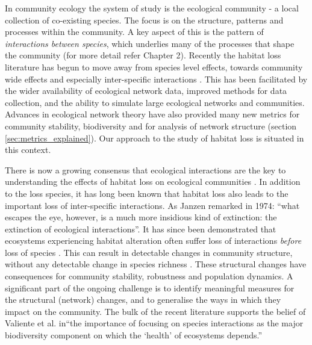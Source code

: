 
In community ecology the system of study is the ecological community - a local collection of co-existing species. The focus is on the structure, patterns and processes within the community. A key aspect of this is the pattern of \emph{interactions between species}, which underlies many of the processes that shape the community (for more detail refer Chapter 2). Recently the habitat loss literature has begun to move away from species level effects, towards community wide effects and especially inter-specific interactions \cite{valiente2015beyond}. This has been facilitated by the wider availability of ecological network data, improved methods for data collection, and the ability to simulate large ecological networks and communities. Advances in ecological network theory have also provided many new metrics for community stability, biodiversity and for analysis of network structure (section \ref{sec:metrics_explained}). Our approach to the study of habitat loss is situated in this context.




There is now a growing consensus that ecological interactions are the key to understanding the effects of habitat loss on ecological communities \cite{memmott2007conservation, hagen2012biodiversity, gonzalez2011disentangled}. In addition to the loss species, it has long been known that habitat loss also leads to the important loss of inter-specific interactions. As Janzen remarked \cite{janzen1974} in 1974: ``what escapes the eye, however, is a much more insidious kind of extinction: the extinction of ecological interactions''. It has since been demonstrated that ecosystems experiencing habitat alteration often suffer loss of interactions \emph{before} loss of species \cite{valiente2015beyond, fortuna2013habitat, albrecht2007interaction}. This can result in detectable changes in community structure, without any detectable change in species richness \cite{tylianakis2007habitat}. These structural changes have consequences for community stability, robustness and population dynamics. A significant part of the ongoing challenge is to identify meaningful measures for the structural (network) changes, and to generalise the ways in which they impact on the community. The bulk of the recent literature supports the belief of Valiente et al. \cite{valiente2015beyond} in``the importance of focusing on species interactions as the major biodiversity component on which the `health' of ecosystems depends.''     

